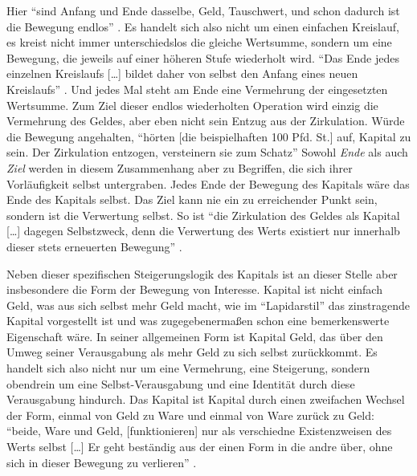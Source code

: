 \documentclass[12pt,
               paper=a4,
               twoside=false,
               onehalfspacing,
               bibliography=totoc,
               toc=graduated,
               ]{scrartcl}
\newcommand{\lips}{\dots\unkern}
\newcommand{\pc}[2]{\parencite[#1]{#2}}
\begin{document}
Hier "`sind Anfang und Ende dasselbe, Geld, Tauschwert, und schon
dadurch ist die Bewegung endlos"' \pc{166}{kap}. Es handelt sich also
nicht um einen einfachen Kreislauf, es kreist nicht immer
unterschiedslos die gleiche Wertsumme, sondern um eine Bewegung, die
jeweils auf einer höheren Stufe wiederholt wird. "`Das Ende jedes
einzelnen Kreislaufs [\lips] bildet daher von selbst den Anfang eines
neuen Kreislaufs"' \pc{S. 166 f.}{kap}. Und jedes Mal steht am Ende
eine Vermehrung der eingesetzten Wertsumme. Zum Ziel dieser endlos
wiederholten Operation wird einzig die Vermehrung des Geldes, aber
eben nicht sein Entzug aus der Zirkulation. Würde die Bewegung
angehalten, "`hörten [die beispielhaften 100 Pfd. St.] auf, Kapital zu
sein. Der Zirkulation entzogen, versteinern sie zum Schatz"'
\pc{166}{kap} Sowohl \emph{Ende} als auch \emph{Ziel} werden in diesem
Zusammenhang aber zu Begriffen, die sich ihrer Vorläufigkeit selbst
untergraben. Jedes Ende der Bewegung des Kapitals wäre das Ende des
Kapitals selbst. Das Ziel kann nie ein zu erreichender Punkt sein,
sondern ist die Verwertung selbst. So ist "`die Zirkulation des Geldes
als Kapital [\lips] dagegen Selbstzweck, denn die Verwertung des Werts
existiert nur innerhalb dieser stets erneuerten Bewegung"'
\pc{167}{kap}.




Neben dieser spezifischen Steigerungslogik des Kapitals ist an dieser
Stelle aber insbesondere die Form der Bewegung von Interesse. Kapital
ist nicht einfach Geld, was aus sich selbst mehr Geld macht, wie im
"`Lapidarstil"' \pc{170}{kap} das zinstragende Kapital vorgestellt ist
und was zugegebenermaßen schon eine bemerkenswerte Eigenschaft wäre.
In seiner allgemeinen Form ist Kapital Geld, das über den Umweg seiner
Verausgabung als mehr Geld zu sich selbst zurückkommt. Es handelt sich
also nicht nur um eine Vermehrung, eine Steigerung, sondern obendrein
um eine Selbst-Verausgabung und eine Identität durch diese
Verausgabung hindurch. Das Kapital ist Kapital durch einen zweifachen
Wechsel der Form, einmal von Geld zu Ware und einmal von Ware zurück
zu Geld: "`beide, Ware und Geld, [funktionieren] nur als verschiedne
Existenzweisen des Werts selbst [\lips] Er geht beständig aus der
einen Form in die andre über, ohne sich in dieser Bewegung zu
verlieren"' \pc{S. 168 f.}{kap}.
\end{document}
